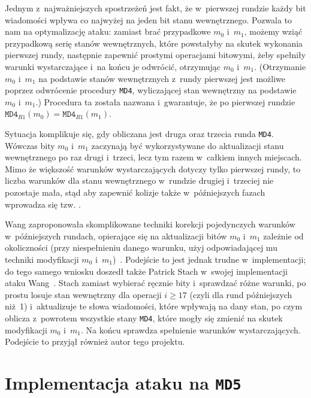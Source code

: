 \documentclass[12pt,a4paper,twoside]{article}
\begin{document}
Jednym z~najważniejszych spostrzeżeń jest fakt, że w~pierwszej rundzie każdy
bit wiadomości wpływa co najwyżej na jeden bit stanu wewnętrznego. Pozwala to
nam na optymalizację ataku: zamiast brać przypadkowe $m_0$ i~$m_1$, możemy
wziąć przypadkową serię stanów wewnętrznych, które powstałyby na skutek
wykonania pierwszej rundy, następnie zapewnić prostymi operacjami bitowymi,
żeby spełniły warunki wystarczające i~na końcu je odwrócić, otrzymując $m_0$
i~$m_1$. (Otrzymanie $m_0$ i~$m_1$ na podstawie stanów wewnętrznych z~rundy
pierwszej jest możliwe poprzez odwrócenie procedury \texttt{MD4}, wyliczającej
stan wewnętrzny na podstawie $m_0$ i~$m_1$.) Procedura ta została nazwana
 i~gwarantuje, że po pierwszej rundzie
$\mathtt{MD4}_{R1}(m_0) = \mathtt{MD4}_{R1}(m_1)$.

Sytuacja komplikuje się, gdy obliczana jest druga oraz trzecia runda
\texttt{MD4}. Wówczas bity $m_0$ i~$m_1$ zaczynają być wykorzystywane do
aktualizacji stanu wewnętrznego po raz drugi i~trzeci, lecz tym razem w~całkiem
innych miejscach. Mimo że większość warunków wystarczających dotyczy tylko
pierwszej rundy, to liczba warunków dla stanu wewnętrznego w~rundzie drugiej
i~trzeciej nie pozostaje mała, stąd aby zapewnić kolizje także w~późniejszych
fazach wprowadza się tzw. .

Wang zaproponowała skomplikowane techniki korekcji pojedynczych warunków
w~późniejszych rundach, opierające się na aktualizacji bitów $m_0$ i~$m_1$
zależnie od okoliczności (przy niespełnieniu danego warunku, użyj
odpowiadającej mu techniki modyfikacji $m_0$ i~$m_1$)~\cite{wang2005md4}.
Podejście to jest jednak trudne w~implementacji; do tego samego wniosku doszedł
także Patrick Stach w~swojej implementacji ataku Wang~\cite{stach2005md4}.
Stach zamiast wybierać ręcznie bity i~sprawdzać różne warunki, po prostu losuje
stan wewnętrzny dla operacji $i \geq 17$ (czyli dla rund późniejszych niż~1)
i~aktualizuje te słowa wiadomości, które wpływają na dany stan, po czym oblicza
z~powrotem wszystkie stany \texttt{MD4}, które mogły się zmienić na skutek
modyfikacji $m_0$ i~$m_1$. Na końcu sprawdza spełnienie warunków
wystarczających. Podejście to przyjął również autor tego projektu.

\section{Implementacja ataku na \texttt{MD5}}
\end{document}
